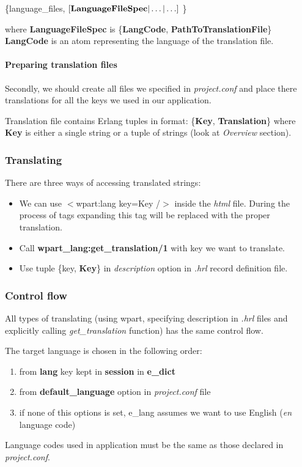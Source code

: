 \{language\_files, $\left[ {\bf LanguageFileSpec} | \ldots | \ldots \right]$ \}

where {\bf LanguageFileSpec} is
\{{\bf LangCode}, {\bf PathToTranslationFile}\}
{\bf LangCode} is an atom representing the language of the translation file.

\paragraph{Preparing translation files}Secondly, we should create all files we specified in {\it project.conf} and place there translations for all the keys we used in our application.

Translation file contains Erlang tuples in format:
\{{\bf Key}, {\bf Translation}\}
where {\bf Key} is either a single string or a tuple of strings (look at {\it Overview} section).

\subsubsection{Translating} There are three ways of accessing translated strings:
\begin{itemize}
\item We can use $<$wpart:lang key=Key /$>$ inside the {\it html} file. During the process of tags expanding this tag will be replaced with the proper translation.
\item Call {\bf wpart\_lang:get\_translation/1} with key we want to translate.
\item Use tuple \{key, {\bf Key}\} in {\it description} option in {\it .hrl} record definition file.
\end{itemize}

\subsubsection{Control flow} All types of translating (using wpart, specifying description in {\it .hrl} files and explicitly calling {\it get\_translation} function) has the same control flow.

The target language is chosen in the following order:
\begin{enumerate}
\item from {\bf lang} key kept in {\bf session} in {\bf e\_dict}
\item from {\bf default\_language} option in {\it project.conf} file
\item if none of this options is set, e\_lang assumes we want to use English ({\it en} language code)
\end{enumerate}
Language codes used in application must be the same as those declared in {\it project.conf}.

